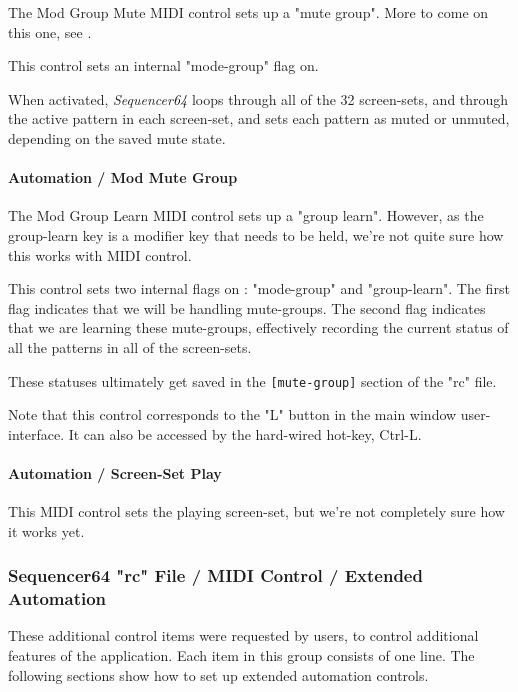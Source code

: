    The Mod Group Mute MIDI control sets up a "mute group".
   More to come on this one,
   see .

   This control sets an internal "mode-group" flag on.

   When activated, \textsl{Sequencer64} loops through all of the 32
   screen-sets, and through the active pattern in each screen-set, and
   sets each pattern as muted or unmuted, depending on the saved mute state.

\paragraph{Automation / Mod Mute Group}
\label{paragraph:seq64_rc_file_midi_ctrl_modgmute}

   The Mod Group Learn MIDI control sets up a "group learn".
   However, as the group-learn key is a modifier key that needs to
   be held, we're not quite sure how this works with MIDI control.

   This control sets two internal flags on : "mode-group" and "group-learn".
   The first flag indicates that we will be handling mute-groups.
   The second flag indicates that we are learning these mute-groups,
   effectively recording the current status of all the patterns in all of the
   screen-sets.

   These statuses ultimately get saved in the \texttt{[mute-group]} section of
   the "rc" file.

   Note that this control corresponds to the "L" button in the main window
   user-interface.
   It can also be accessed by the hard-wired hot-key, Ctrl-L.

\paragraph{Automation / Screen-Set Play}
\label{paragraph:seq64_rc_file_midi_ctrl_ssplay}

This MIDI control sets the playing screen-set, 
but we're not completely sure how it works yet.

\subsubsection{Sequencer64 "rc" File / MIDI Control / Extended Automation}
\label{subsubsec:seq64_rc_file_midi_ctrl_automationex}

   These additional control items were requested by users, to control
   additional features of the application.
   Each item in this group consists of one line.
   The following sections show how to set up extended automation controls.

